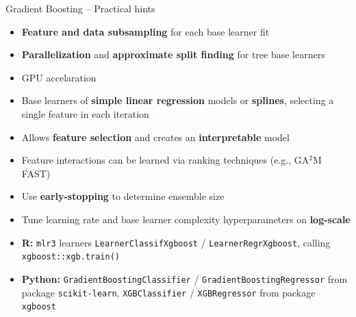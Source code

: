 \begin{frame}{Gradient Boosting -- Practical hints}

\footnotesize


\begin{itemize}
  \item \textbf{Feature and data subsampling} for each base learner fit
  \item \textbf{Parallelization} and \textbf{approximate split finding} for tree base learners
  \item GPU accelaration
\end{itemize}

\medskip

\begin{itemize}
    \item Base learners of \textbf{simple linear regression} models or \textbf{splines}, selecting a single feature in each iteration
    \item Allows \textbf{feature selection} and creates an \textbf{interpretable} model
    \item Feature interactions can be learned via ranking techniques (e.g., GA$^2$M FAST)
\end{itemize}

\medskip

\begin{itemize}
    \item Use \textbf{early-stopping} to determine ensemble size
    \item Tune learning rate and base learner complexity hyperparameters on \textbf{log-scale}
\end{itemize}

\medskip


\begin{itemize}
  \item \textbf{R:} \texttt{mlr3} learners \texttt{LearnerClassifXgboost} / 
  \texttt{LearnerRegrXgboost}, calling \texttt{xgboost::xgb.train()}
  \item \textbf{Python:} \texttt{GradientBoostingClassifier} / 
  \texttt{GradientBoostingRegressor} from package \texttt{scikit-learn}, 
  \texttt{XGBClassifier} / \texttt{XGBRegressor} from package \texttt{xgboost}
\end{itemize}

\end{frame}